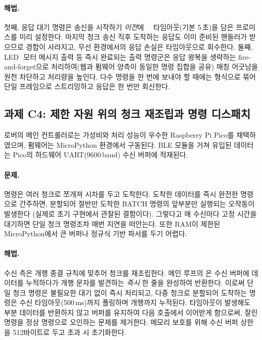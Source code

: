 \documentclass[10pt]{article}
\begin{document}
\paragraph{해법.}
첫째, 응답 대기 명령은 송신을 시작하기 \emph{이전}에 \,\textperiodcentered\,
\,\textperiodcentered\,타임아웃(기본 5\,초)을 담은 프로미스를 미리
설정한다. 마지막 청크 송신 직후 도착하는 응답도 이미 준비된 핸들러가 받으므로 경합이
사라지고, 무선 환경에서의 응답 손실은 타임아웃으로 회수한다. 둘째, LED\,\textperiodcentered\,
모터\,\textperiodcentered\,메시지 출력 등 즉시 완료되는 출력 명령군은 응답 왕복을
생략하는 fire-and-forget으로 처리하여(웹과 펌웨어 양측이 동일한 명령 집합을 공유)
매칭 어긋남을 원천 차단하고 처리량을 높인다. 다수 명령을 한 번에 보내야 할 때에는
 형식으로 묶어 단일 프레임으로 스트리밍하고 응답은 한 번만
회신한다.

\subsection{과제 C4: 제한 자원 위의 청크 재조립과 명령 디스패치}
\label{sec:c4}

로버의 메인 컨트롤러로는 가성비와 처리 성능이 우수한 Raspberry Pi Pico를
채택하였으며, 펌웨어는 MicroPython 환경에서 구동된다. BLE 모듈을 거쳐 유입된
데이터는 Pico의 하드웨어 UART(9600\,baud) 수신 버퍼에 적재된다.

\paragraph{문제.}
명령은 여러 청크로 쪼개져 시차를 두고 도착한다. 도착한 데이터를 즉시 완전한 명령으로
간주하면, 분할되어 절반만 도착한 BATCH 명령의 앞부분만 실행되는 오작동이 발생한다
(실제로 초기 구현에서 관찰된 결함이다). 그렇다고 매 수신마다 고정 시간을 대기하면
단일 청크 명령조차 매번 지연을 떠안는다. 또한 RAM이 제한된 MicroPython에서 큰 버퍼나
정규식 기반 파서를 두기 어렵다.

\paragraph{해법.}
수신 측은 개행 종결 규칙에 맞추어 청크를 재조립한다. 메인 루프의
은 수신 버퍼에 데이터를 누적하다가 개행 문자를 발견하는
\emph{즉시} 한 줄을 완성하여 반환한다. 이로써 단일 청크 명령은 불필요한 대기 없이
즉시 처리되고, 다중 청크로 분할되어 도착하는 명령은 수신 타임아웃(500\,ms)까지
폴링하며 개행까지 누적된다. 타임아웃이 발생해도 부분 데이터를 반환하지 않고 버퍼를
유지하여 다음 호출에서 이어받게 함으로써, 잘린 명령을 정상 명령으로 오인하는 문제를
제거한다. 메모리 보호를 위해 수신 버퍼 상한을 512바이트로 두고 초과 시 초기화한다.
\end{document}
